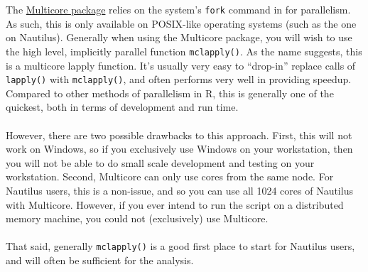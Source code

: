 The \href{http://cran.r-project.org/web/packages/multicore/index.html}{Multicore package} relies on the system's \texttt{fork} command in for parallelism.  As such, this is only available on POSIX-like operating systems (such as the one on Nautilus).  Generally when using the Multicore package, you will wish to use the high level, implicitly parallel function \texttt{mclapply()}.  As the name suggests, this is a multicore lapply function.  It's usually very easy to ``drop-in'' replace calls of \texttt{lapply()} with \texttt{mclapply()}, and often performs very well in providing speedup.  Compared to other methods of parallelism in R, this is generally one of the quickest, both in terms of development and run time.
\\\\
%
However, there are two possible drawbacks to this approach.  First, this will not work on Windows, so if you exclusively use Windows on your workstation, then you will not be able to do small scale development and testing on your workstation.  Second, Multicore can only use cores from the same node.  For Nautilus users, this is a non-issue, and so you can use all 1024 cores of Nautilus with Multicore.  However, if you ever intend to run the script on a distributed memory machine, you could not (exclusively) use Multicore.\\\\
%
That said, generally \texttt{mclapply()} is a good first place to start for Nautilus users, and will often be sufficient for the analysis.

